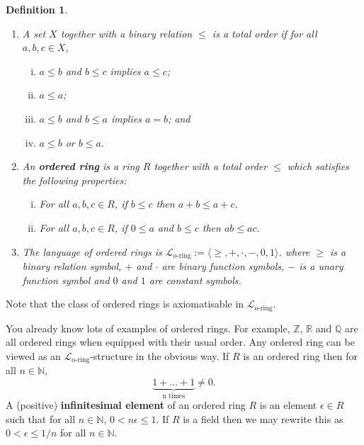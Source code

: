 \documentclass[11pt]{article}
\newtheorem{definition}[theorem]{Definition}
\newcommand{\mcal}[1]{\mathcal{#1}}
\newcommand{\R}{\mathbb{R}}
\newcommand{\Z}{\mathbb{Z}}
\newcommand{\N}{\mathbb{N}}
\newcommand{\Q}{\mathbb{Q}}
\begin{document}
\begin{definition}
\
\begin{enumerate}
\item A set $X$ together with a binary relation $\leq$ is a total order if for all $a,b,c\in X$,
\begin{enumerate}[(i)]
\item $a\leq b$ and $b\leq c$ implies $a\leq c$;
\item $a\leq a$;
\item $a\leq b$ and $b\leq a$ implies $a=b$; and
\item $a\leq b$ or $b\leq a$.
\end{enumerate}
\item An \textbf{ordered ring} is a ring $R$ together with a total order $\leq$ which satisfies the following properties:
\begin{enumerate}[(i)]
\item For all $a,b,c\in R$, if $b\leq c$ then $a+b\leq a+c$.
\item For all $a,b,c\in R$, if $0\leq a$ and $b\leq c$ then $ab\leq ac$.
\end{enumerate}
\item The language of ordered rings is  $\mcal{L}_{\text{o-ring}}:=\langle \geq, +,\cdot,-,0,1\rangle$.  where $\geq$ is a binary relation symbol, $+$ and $\cdot$ are binary function symbols, $-$ is a unary function symbol and $0$ and $1$ are constant symbols.
\end{enumerate}
\end{definition}

Note that the class of ordered rings is axiomatisable in $\mcal{L}_{\text{o-ring}}$.

You already know lots of examples of ordered rings. For example, $\Z$, $\R$ and $\Q$ are all ordered rings when equipped with their usual order. Any ordered ring can be viewed as an $\mcal{L}_{\text{o-ring}}$-structure in the obvious way. If $R$ is an ordered ring then for all $n\in\N$, \[\underbrace{1+\ldots+1}_{\text{n times}}\neq 0.\]
A (positive) \textbf{infinitesimal element} of an ordered ring $R$ is an element $\epsilon\in R$ such that for all $n\in\N$, $0<n\epsilon \leq 1$. If $R$ is a field then we may rewrite this as $0<\epsilon\leq 1/n$ for all $n\in\N$.
\end{document}
